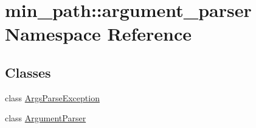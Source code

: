 \hypertarget{namespacemin__path_1_1argument__parser}{}\section{min\+\_\+path\+:\+:argument\+\_\+parser Namespace Reference}
\label{namespacemin__path_1_1argument__parser}
\subsection*{Classes}
\begin{DoxyCompactItemize}
\item 
class \hyperlink{classmin__path_1_1argument__parser_1_1_args_parse_exception}{Args\+Parse\+Exception}
\item 
class \hyperlink{classmin__path_1_1argument__parser_1_1_argument_parser}{Argument\+Parser}
\end{DoxyCompactItemize}
